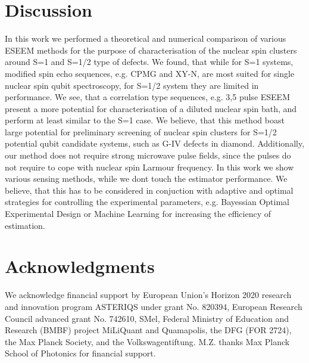 \documentclass[%
 reprint,
superscriptaddress,
 amsmath,amssymb,
 aps,
]{revtex4-2}
\begin{document}
\section{Discussion}

In this work we performed a theoretical and numerical comparison of various ESEEM methods for the purpose of characterisation of the nuclear spin clusters around S=1 and S=1/2 type of defects.
We found, that while for S=1 systems, modified spin echo sequences, e.g. CPMG and XY-N, are most suited for single nuclear spin qubit spectroscopy, for S=1/2 system they are limited in performance. 
We see, that a correlation type sequences, e.g. 3,5 pulse ESEEM present a more potential for characterisation of a diluted nuclear spin bath, and perform at least similar to the S=1 case. 
We believe, that this method boast large potential for preliminary screening of nuclear spin clusters for S=1/2 potential qubit candidate systems, such as G-IV defects in diamond. Additionally, our method does not require strong microwave pulse fields, since the pulses do not require to cope with nuclear spin Larmour frequency. 
In this work we show various sensing methods, while we dont touch the estimator performance. 
We believe, that this has to be considered in conjuction with adaptive and optimal strategies for controlling the experimental parameters, e.g. Bayessian Optimal Experimental Design or Machine Learning for increasing the efficiency of estimation. 

\section*{Acknowledgments}
We acknowledge financial support by European Union's Horizon 2020 research and innovation program ASTERIQS under grant No. 820394, European Research Council advanced grant No. 742610, SMel, Federal Ministry of Education and Research (BMBF) project MiLiQuant and Quamapolis, the DFG (FOR 2724), the Max Planck Society, and the Volkswagentiftung. M.Z. thanks Max Planck School of Photonics for financial support.


\appendix
\end{document}
